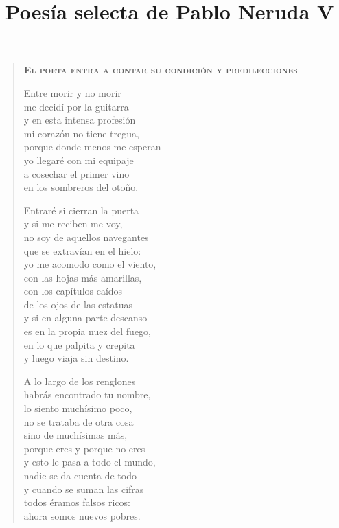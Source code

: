 \documentclass[12pt]{article}
\date{}
\title{Poesía selecta de Pablo Neruda V}
\begin{document}
\maketitle
\tableofcontents
\clearpage
{}
\begin{verse}

{\bfseries\scshape {El poeta entra a contar su condición y predilecciones}}

Entre morir y no morir\\
me decidí por la guitarra\\
y en esta intensa profesión\\
mi corazón no tiene tregua,\\
porque donde menos me esperan\\
yo llegaré con mi equipaje\\
a cosechar el primer vino\\
en los sombreros del otoño.  

Entraré si cierran la puerta\\
y si me reciben me voy,\\
no soy de aquellos navegantes\\
que se extravían en el hielo:\\
yo me acomodo como el viento,\\
con las hojas más amarillas,\\
con los capítulos caídos\\
de los ojos de las estatuas\\
y si en alguna parte descanso\\
es en la propia nuez del fuego,\\
en lo que palpita y crepita\\
y luego viaja sin destino.  

A lo largo de los renglones\\
habrás encontrado tu nombre,\\
lo siento muchísimo poco,\\
no se trataba de otra cosa\\
sino de muchísimas más,\\
porque eres y porque no eres\\
y esto le pasa a todo el mundo,\\
nadie se da cuenta de todo\\
y cuando se suman las cifras\\
todos éramos falsos ricos:\\
ahora somos nuevos pobres.  


\end{verse}
\end{document}
